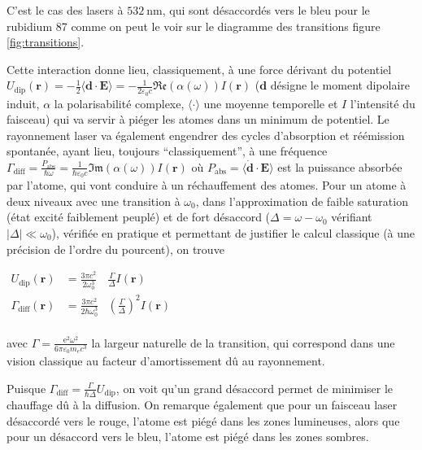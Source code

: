 \documentclass[11pt,a4paper] { article}
\newcommand{\lmbd}[1]{$\SI{#1}{\nano\metre}$}
\newcommand{\e}[1]{\text{e}^{#1}}
\newcommand{\mathsc}[1]{\mathrm{\scriptscriptstyle {#1}}}
\renewcommand{\v}[1]{\boldsymbol{\mathbf{#1}}}
\newenvironment{salign}{
\centering
  $ \displaystyle
    \begin{aligned} 
}
{
    \end{aligned}  $ 
\par
}
\begin{document}
C'est le cas des lasers à \lmbd{532}, qui sont désaccordés vers le bleu pour le rubidium 87 comme on peut le voir sur le diagramme des transitions figure \ref{fig:transitions}.

Cette interaction donne lieu, classiquement, à une force dérivant du potentiel $U_\mathsc{dip}(\v r) = {-\frac12 \langle \v d \cdot \v E \rangle} = -\frac{1}{2\varepsilon_0 c}\mathfrak{Re}\left(\alpha(\omega)\right) I(\v r)$ ($\v d$ désigne le moment dipolaire induit, $\alpha$ la polarisabilité complexe, $\langle \cdot \rangle$ une moyenne temporelle et $I$ l'intensité du faisceau)
qui va servir à piéger les atomes dans un minimum de potentiel. Le rayonnement laser va également engendrer des cycles d'absorption et réémission spontanée, ayant lieu, toujours ``classiquement'', à une fréquence $\Gamma_\mathsc{diff} = \frac{P_\mathsc{abs}}{\hbar \omega} = \frac{1}{\hbar \varepsilon_0 c} \mathfrak{Im}\left(\alpha(\omega)\right) I(\v r)$ où $P_\mathsc{abs} = \langle \dot{\v d} \cdot \v E \rangle$ est la puissance absorbée par l'atome, qui vont conduire à un réchauffement des atomes. 
Pour un atome à deux niveaux avec une transition à $\omega_0$, dans l'approximation de faible saturation (état excité faiblement peuplé) et de fort désaccord ($\Delta = \omega - \omega_0$ vérifiant $|\Delta| \ll \omega_0$), vérifiée en pratique et permettant de justifier le calcul classique (à une précision de l'ordre du pourcent), on trouve

\begin{salign}
	U_\mathsc{dip}(\v r)&=\frac{3\pi c^2}{2\omega_0^3} & \frac{\Gamma}{\Delta} I(\v r) \\
	\Gamma_\mathsc{diff}(\v r)&=\frac{3\pi c^2}{2\hbar\omega_0^3} & \left(\frac{\Gamma}{\Delta}\right)^2 I(\v r) \\
\end{salign}

avec $\Gamma = \frac{\e 2 \omega^2}{6 \pi \varepsilon_0 m_e c^3}$ la largeur naturelle de la transition, qui correspond dans une vision classique au facteur d'amortissement dû au rayonnement.

Puisque $\Gamma_\mathsc{diff}=\frac{\Gamma}{\hbar \Delta} U_\mathsc{dip}$, on voit qu'un grand désaccord permet de minimiser le chauffage dû à la diffusion. On remarque également que pour un faisceau laser désaccordé vers le rouge, l'atome est piégé dans les zones lumineuses, alors que pour un désaccord vers le bleu, l'atome est piégé dans les zones sombres.
\end{document}
